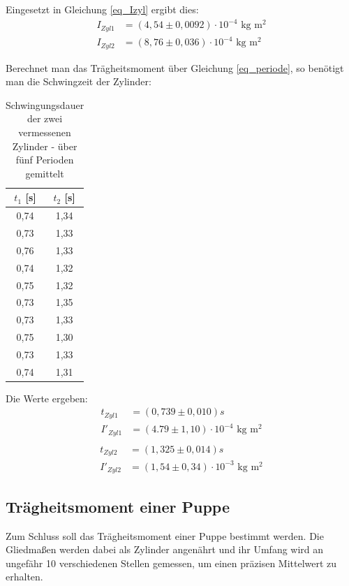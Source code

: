 Eingesetzt in Gleichung \eqref{eq_Izyl} ergibt dies:
\begin{align*}
I_{Zyl 1}&=(4,54\pm0,0092)\cdot10^{-4}\text{ kg m$^2$}\\
I_{Zyl 2}&=(8,76\pm0,036)\cdot10^{-4}\text{ kg m$^2$}
\end{align*}

Berechnet man das Trägheitsmoment über Gleichung \eqref{eq_periode}, so benötigt man die Schwingzeit der Zylinder:
\begin{table}[htbp]
\begin{tabular}{|c|c|}
\hline 
$t_1$ [s] & $t_2$ [s]\\ \hline
0,74&	1,34\\ \hline
0,73&	1,33\\ \hline
0,76&	1,33\\ \hline
0,74&	1,32\\ \hline
0,75&	1,32\\ \hline
0,73&	1,35\\ \hline
0,73&	1,33\\ \hline
0,75&	1,30\\ \hline
0,73&	1,33\\ \hline
0,74&	1,31\\ \hline
\end{tabular} 
\caption{Schwingungsdauer der zwei vermessenen Zylinder - über fünf Perioden \mbox{gemittelt}}
\end{table}

Die Werte ergeben:
\begin{align*}
t_{Zyl 1}&=(0,739 \pm 0,010)s\\
I'_{Zyl 1}&=(4.79\pm1,10)\cdot10^{-4}\text{ kg m$^2$}\\
\end{align*}
\begin{align*}
t_{Zyl 2}&=(1,325 \pm  0,014)s\\ 
I'_{Zyl 2}&=(1,54\pm0,34)\cdot10^{-3}\text{ kg m$^2$}
\end{align*}

\subsection{Trägheitsmoment einer Puppe}
Zum Schluss soll das Trägheitsmoment einer Puppe bestimmt werden. Die Gliedmaßen werden dabei als Zylinder angenährt und ihr Umfang wird an ungefähr 10 verschiedenen Stellen gemessen, um einen präzisen Mittelwert zu erhalten.

